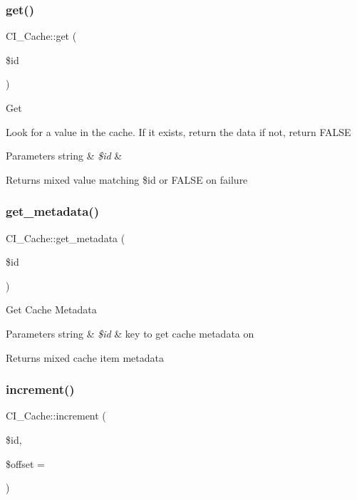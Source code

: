 \subsubsection{\texorpdfstring{get()}{get()}}
{\footnotesize\ttfamily C\+I\+\_\+\+Cache\+::get (\begin{DoxyParamCaption}\item[{}]{\$id }\end{DoxyParamCaption})}

Get

Look for a value in the cache. If it exists, return the data if not, return F\+A\+L\+SE


\begin{DoxyParams}[1]{Parameters}
string & {\em \$id} & \\
\hline
\end{DoxyParams}
\begin{DoxyReturn}{Returns}
mixed value matching \$id or F\+A\+L\+SE on failure 
\end{DoxyReturn}
\mbox{\label{class_c_i___cache_a908e8631c7156e956182249e0eeddc4e}} 
\subsubsection{\texorpdfstring{get\+\_\+metadata()}{get\_metadata()}}
{\footnotesize\ttfamily C\+I\+\_\+\+Cache\+::get\+\_\+metadata (\begin{DoxyParamCaption}\item[{}]{\$id }\end{DoxyParamCaption})}

Get Cache Metadata


\begin{DoxyParams}[1]{Parameters}
string & {\em \$id} & key to get cache metadata on \\
\hline
\end{DoxyParams}
\begin{DoxyReturn}{Returns}
mixed cache item metadata 
\end{DoxyReturn}
\mbox{\label{class_c_i___cache_ad38861348c6790361b2b01363a6b0df8}} 
\subsubsection{\texorpdfstring{increment()}{increment()}}
{\footnotesize\ttfamily C\+I\+\_\+\+Cache\+::increment (\begin{DoxyParamCaption}\item[{}]{\$id,  }\item[{}]{\$offset = {} }\end{DoxyParamCaption})}

